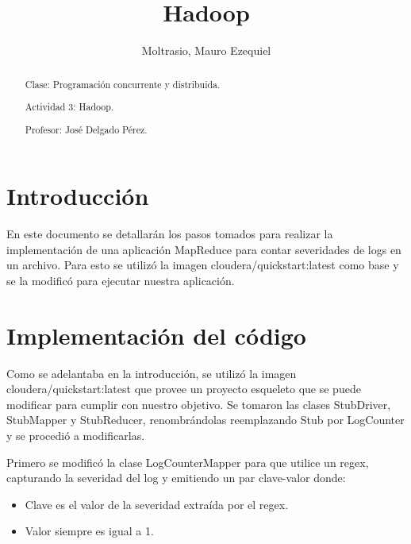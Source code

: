\documentclass[a4paper]{article}
\begin{document}
\title{Hadoop}
\author{Moltrasio, Mauro Ezequiel}
\date{}
\renewcommand{\abstractname}{\vspace{-\baselineskip}}

\begin{titlingpage}
    \maketitle
    \begin{abstract}

        Clase: Programación concurrente y distribuida.

        Actividad 3: Hadoop.

        Profesor: José Delgado Pérez.
    \end{abstract}
\end{titlingpage}

\maketitle
\tableofcontents

\section{Introducción}

En este documento se detallarán los pasos tomados para realizar la
implementación de una aplicación MapReduce para contar severidades de logs en
un archivo. Para esto se utilizó la imagen cloudera/quickstart:latest
como base y se la modificó para ejecutar nuestra aplicación.

\section{Implementación del código}

Como se adelantaba en la introducción, se utilizó la imagen
cloudera/quickstart:latest que provee un proyecto esqueleto que se
puede modificar para cumplir con nuestro objetivo. Se tomaron las clases
StubDriver, StubMapper y StubReducer, renombrándolas reemplazando Stub por
LogCounter y se procedió a modificarlas.

Primero se modificó la clase LogCounterMapper para que utilice un regex,
capturando la severidad del log y emitiendo un par clave-valor donde:

\begin{itemize}
    \item Clave es el valor de la severidad extraída por el regex.
    \item Valor siempre es igual a 1.
\end{itemize}
\end{document}
